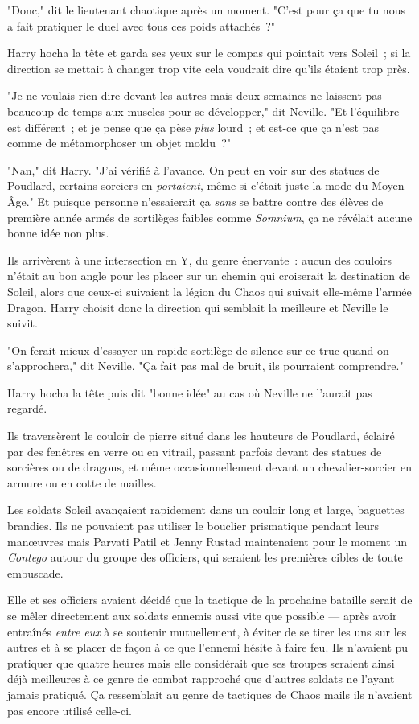 "Donc," dit le lieutenant chaotique après un moment. "C'est pour ça que tu nous a fait pratiquer le duel avec tous ces poids attachés~?"

Harry hocha la tête et garda ses yeux sur le compas qui pointait vers Soleil~; si la direction se mettait à changer trop vite cela voudrait dire qu'ils étaient trop près.

"Je ne voulais rien dire devant les autres mais deux semaines ne laissent pas beaucoup de temps aux muscles pour se développer," dit Neville. "Et l'équilibre est différent~; et je pense que ça pèse \emph{plus} lourd~; et est-ce que ça n'est pas comme de métamorphoser un objet moldu~?"

"Nan," dit Harry. "J'ai vérifié à l'avance. On peut en voir sur des statues de Poudlard, certains sorciers en \emph{portaient}, même si c'était juste la mode du Moyen-Âge." Et puisque personne n'essaierait ça \emph{sans} se battre contre des élèves de première année armés de sortilèges faibles comme \emph{Somnium}, ça ne révélait aucune bonne idée non plus.

Ils arrivèrent à une intersection en Y, du genre énervante~: aucun des couloirs n'était au bon angle pour les placer sur un chemin qui croiserait la destination de Soleil, alors que ceux-ci suivaient la légion du Chaos qui suivait elle-même l'armée Dragon. Harry choisit donc la direction qui semblait la meilleure et Neville le suivit.

"On ferait mieux d'essayer un rapide sortilège de silence sur ce truc quand on s'approchera," dit Neville. "Ça fait pas mal de bruit, ils pourraient comprendre."

Harry hocha la tête puis dit "bonne idée" au cas où Neville ne l'aurait pas regardé.

Ils traversèrent le couloir de pierre situé dans les hauteurs de Poudlard, éclairé par des fenêtres en verre ou en vitrail, passant parfois devant des statues de sorcières ou de dragons, et même occasionnellement devant un chevalier-sorcier en armure ou en cotte de mailles.

\later

Les soldats Soleil avançaient rapidement dans un couloir long et large, baguettes brandies. Ils ne pouvaient pas utiliser le bouclier prismatique pendant leurs manœuvres mais Parvati Patil et Jenny Rustad maintenaient pour le moment un \emph{Contego} autour du groupe des officiers, qui seraient les premières cibles de toute embuscade.

Elle et ses officiers avaient décidé que la tactique de la prochaine bataille serait de se mêler directement aux soldats ennemis aussi vite que possible — après avoir entraînés \emph{entre eux} à se soutenir mutuellement, à éviter de se tirer les uns sur les autres et à se placer de façon à ce que l'ennemi hésite à faire feu. Ils n'avaient pu pratiquer que quatre heures mais elle considérait que ses troupes seraient ainsi déjà meilleures à ce genre de combat rapproché que d'autres soldats ne l'ayant jamais pratiqué. Ça ressemblait au genre de tactiques de Chaos mails ils n'avaient pas encore utilisé celle-ci.

